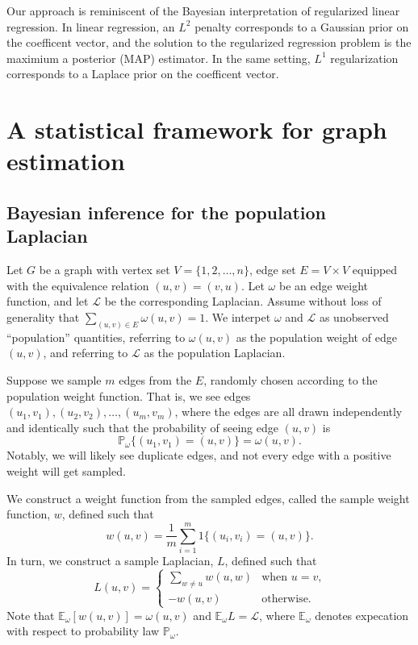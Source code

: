 \documentclass[12pt]{article}
\newcommand{\prob}{\mathbb{P}}
\newcommand{\E}{\mathbb{E}}
\theoremstyle{plain}
\begin{document}
Our approach is reminiscent of the Bayesian interpretation of
regularized linear regression.  In linear regression, an $L^2$ penalty
corresponds to a Gaussian prior on the coefficent vector, and the
solution to the regularized regression problem is the maximium a
posterior (MAP) estimator.  In the same setting, $L^1$ regularization
corresponds to a Laplace prior on the coefficent vector.


\section{A statistical framework for graph estimation}


\subsection{Bayesian inference for the population Laplacian}

Let $G$ be a graph with vertex set $V = \{ 1, 2, \dotsc, n \}$, edge
set $E = V \times V$ equipped with the equivalence relation
$(u,v) = (v,u)$.  Let $\omega$ be an edge weight function, and let
$\mathcal{L}$ be the corresponding Laplacian.  Assume without loss of
generality that $\sum_{(u,v) \in E} \omega(u,v) = 1$.  We interpet
$\omega$ and $\mathcal{L}$ as unobserved ``population'' quantities,
referring to $\omega(u,v)$ as the population weight of edge $(u,v)$,
and referring to $\mathcal{L}$ as the population Laplacian.

Suppose we sample $m$ edges from the $E$, randomly chosen
according to the population weight function.  That is, we see edges
$(u_1, v_1), (u_2, v_2),  \dotsc, (u_m, v_m)$, where the edges are
all drawn independently and identically such that the probability of
seeing edge $(u,v)$ is
\[
  \prob_\omega\{ (u_1, v_1) = (u,v) \} = \omega(u,v).
\]
Notably, we will likely see duplicate edges, and not every edge with a
positive weight will get sampled.

We construct a weight function from the sampled edges, called the
sample weight function, $w$, defined such that
\[
  w(u,v) = \frac{1}{m} \sum_{i=1}^{m} 1\{ (u_i, v_i) = (u,v) \}.
\]
In turn, we construct a sample Laplacian, $L$, defined such that
\[
  L(u,v)
    =
    \begin{cases}
      \sum_{w \neq u} w(u,w) &\text{when $u = v$,} \\
      -w(u,v) &\text{otherwise.}
    \end{cases}
\]
Note that $\E_\omega[w(u,v)] = \omega(u,v)$ and $\E_\omega L =
\mathcal{L}$, where $\E_\omega$ denotes expecation with respect to
probability law $\prob_\omega$.
\end{document}

